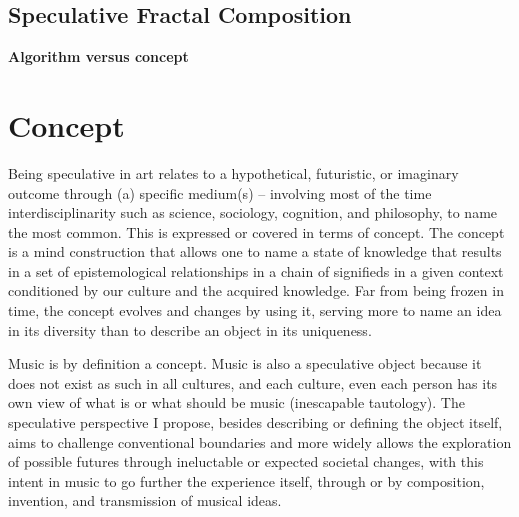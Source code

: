 \documentclass{article}
\begin{document}
\begin{center}
\section*{\huge \sffamily Speculative Fractal Composition}

{\LARGE \textbf{\textcolor{sccomment}{Algorithm versus concept}}}
\end{center}

\bigskip
{} 

\bigskip
\noindent {}
 
 \singlespacing
{}
\smallskip

\section*{Concept}
Being speculative in art relates to a hypothetical, futuristic, or imaginary outcome through (a) specific medium(s) -- involving most of the time interdisciplinarity such as science, sociology, cognition, and philosophy, to name the most common. 
This is expressed or covered in terms of concept.
The concept is a mind construction that allows one to name a state of knowledge that results in a set of epistemological relationships in a chain of signifieds in a given context conditioned by our culture and the acquired knowledge.
Far from being frozen in time, the concept evolves and changes by using it, serving more to name an idea in its diversity than to describe an object in its uniqueness.

\bigskip

Music is by definition a concept. Music is also a speculative object because it does not exist as such in all cultures\cite{jjn}, and each culture, even each person has its own view of what is or what should be music (inescapable tautology).
The speculative perspective I propose, besides describing or defining the object itself, aims to challenge conventional boundaries and more widely allows the exploration of possible futures through ineluctable or expected societal changes, with this intent in music to go further the experience itself, through or by composition, invention, and transmission of musical ideas.
\end{document}
